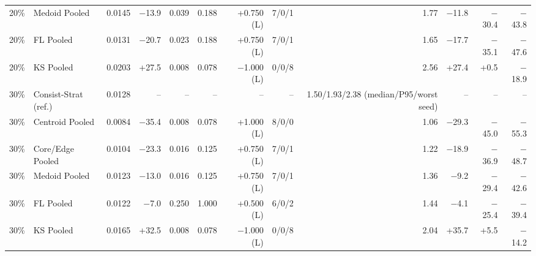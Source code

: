 \begin{tabular}{llrrrrrrrrrr}
20\% & Medoid Pooled & 0.0145 & $-$13.9 & 0.039 & 0.188 & +0.750 (L) & 7/0/1 & 1.77 & $-$11.8 & $-$30.4 & $-$43.8 \\
20\% & FL Pooled & 0.0131 & $-$20.7 & 0.023 & 0.188 & +0.750 (L) & 7/0/1 & 1.65 & $-$17.7 & $-$35.1 & $-$47.6 \\
20\% & KS Pooled & 0.0203 & +27.5 & 0.008 & 0.078 & $-$1.000 (L) & 0/0/8 & 2.56 & +27.4 & +0.5 & $-$18.9 \\
30\% & Consist-Strat (ref.) & 0.0128 & -- & -- & -- & -- & -- & 1.50/1.93/2.38 (median/P95/worst seed) & -- & -- & -- \\
30\% & Centroid Pooled & 0.0084 & $-$35.4 & 0.008 & 0.078 & +1.000 (L) & 8/0/0 & 1.06 & $-$29.3 & $-$45.0 & $-$55.3 \\
30\% & Core/Edge Pooled & 0.0104 & $-$23.3 & 0.016 & 0.125 & +0.750 (L) & 7/0/1 & 1.22 & $-$18.9 & $-$36.9 & $-$48.7 \\
30\% & Medoid Pooled & 0.0123 & $-$13.0 & 0.016 & 0.125 & +0.750 (L) & 7/0/1 & 1.36 & $-$9.2 & $-$29.4 & $-$42.6 \\
30\% & FL Pooled & 0.0122 & $-$7.0 & 0.250 & 1.000 & +0.500 (L) & 6/0/2 & 1.44 & $-$4.1 & $-$25.4 & $-$39.4 \\
30\% & KS Pooled & 0.0165 & +32.5 & 0.008 & 0.078 & $-$1.000 (L) & 0/0/8 & 2.04 & +35.7 & +5.5 & $-$14.2 \\
\bottomrule
\end{tabular}
